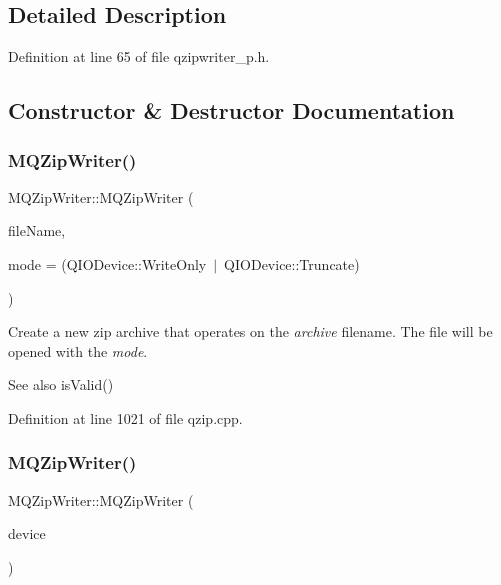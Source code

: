 \subsection{Detailed Description}


Definition at line 65 of file qzipwriter\+\_\+p.\+h.



\subsection{Constructor \& Destructor Documentation}
\mbox{\label{class_m_q_zip_writer_af533fca464fe2bac29083a27b2356f51}} 
\subsubsection{\texorpdfstring{M\+Q\+Zip\+Writer()}{MQZipWriter()}\hspace{0.1cm}{\footnotesize\ttfamily [1/2]}}
{\footnotesize\ttfamily M\+Q\+Zip\+Writer\+::\+M\+Q\+Zip\+Writer (\begin{DoxyParamCaption}\item[{const Q\+String \&}]{file\+Name,  }\item[{Q\+I\+O\+Device\+::\+Open\+Mode}]{mode = {\ttfamily (QIODevice\+:\+:WriteOnly~$\vert$~QIODevice\+:\+:Truncate)} }\end{DoxyParamCaption})}

Create a new zip archive that operates on the {\itshape archive} filename. The file will be opened with the {\itshape mode}. \begin{DoxySeeAlso}{See also}
is\+Valid() 
\end{DoxySeeAlso}


Definition at line 1021 of file qzip.\+cpp.

\mbox{\label{class_m_q_zip_writer_a47881309d8438d2face8d740e17f0b4b}} 
\subsubsection{\texorpdfstring{M\+Q\+Zip\+Writer()}{MQZipWriter()}\hspace{0.1cm}{\footnotesize\ttfamily [2/2]}}
{\footnotesize\ttfamily M\+Q\+Zip\+Writer\+::\+M\+Q\+Zip\+Writer (\begin{DoxyParamCaption}\item[{Q\+I\+O\+Device $\ast$}]{device }\end{DoxyParamCaption})\hspace{0.3cm}{\ttfamily [explicit]}}

